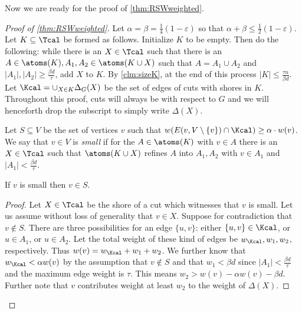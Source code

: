Now we are ready for the proof of \cref{thm:RSWweighted}.
\begin{proof}[Proof of \cref{thm:RSWweighted}]
Let $\alpha=\beta = \frac{1}{4} (1-\varepsilon)$ so that $\alpha + \beta \le \frac{1}{2}(1-\varepsilon)$.  
%
Let $K \subseteq \Tcal$ be formed as follows.  Initialize $K$ to be empty.  Then do the following: while there is an $X \in \Tcal$ such that 
there is an $A \in \atoms(K), A_1, A_2 \in \atoms(K \cup X)$ such that $A = A_1 \cup A_2$ and $|A_1|, |A_2| \ge \frac{\beta d}{\tau}$,
add $X$ to $K$.  
By \cref{clm:sizeK}, at the end of this process $|K| \le \frac{\tau n}{\beta d}$.  
Let $\Kcal = \cup_{X \in K} \Delta_G(X)$ be the set of edges of cuts with shores in $K$.  Throughout this proof, cuts will 
always be with respect to $G$ and we will henceforth drop the subscript to simply write $\Delta(X)$.  

Let $S \subseteq V$ be the set of vertices $v$ such that $w(E(v, V\setminus \{v\}) \cap \Kcal)  \ge \alpha \cdot w(v)$.  
We say that $v \in V$ is \emph{small} if for the $A \in \atoms(K)$ with $v \in A$ there is an $X \in \Tcal$
such that $\atoms(K \cup X)$ refines $A$ into $A_1, A_2$ with $v \in A_1$ and $|A_1| < \frac{\beta d}{\tau}$.  

\begin{claim}
\label{clm:small}
If $v$ is small then $v \in S$.
\end{claim}

\begin{proof}
Let $X \in \Tcal$ be the shore of a cut which witnesses that $v$ is small.  Let us assume without loss of generality that $v \in X$.  
Suppose for contradiction that $v \not \in S$.  There are three possibilities for an edge $\{u,v\}$:  either $\{u,v\} \in \Kcal$, 
or $u \in A_1$, or $u \in A_2$.  Let the total weight of these kind of edges be $w_\Kcal, w_1, w_2$, respectively.  
Thus $w(v) = w_\Kcal + w_1 + w_2$.  We further know that $w_\Kcal < \alpha w(v)$ by the assumption that $v \not \in S$ and that $w_1 < \beta d$ since $|A_1| < \frac{\beta d}{\tau}$ 
and the maximum edge weight is $\tau$.  This means $w_2 > w(v) - \alpha w(v) - \beta d$.  Further note that $v$ contributes weight at least 
$w_2$ to the weight of $\Delta(X)$.  


\end{proof}
\end{proof}
